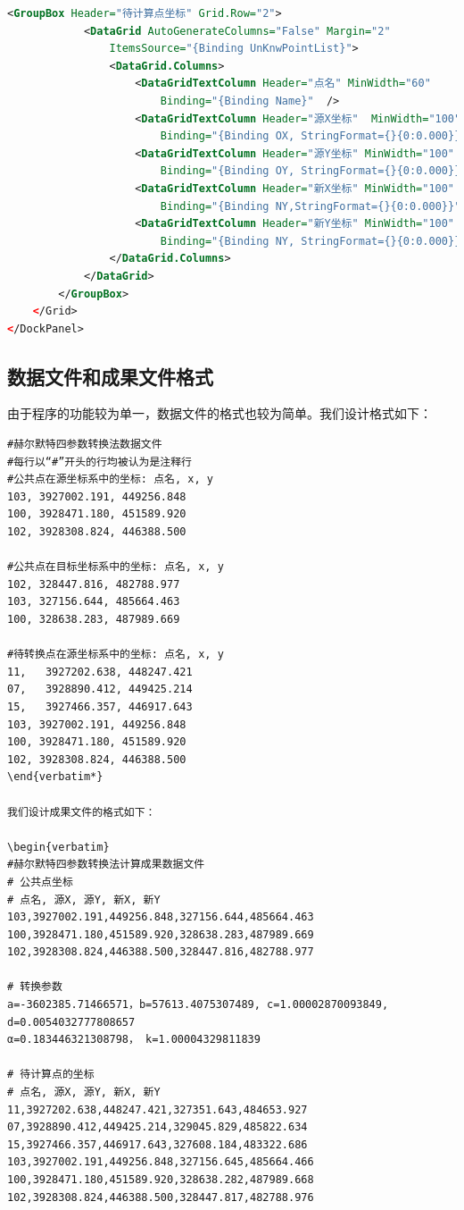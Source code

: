 \begin{lstlisting}[language=xml]
        <GroupBox Header="待计算点坐标" Grid.Row="2">
            <DataGrid AutoGenerateColumns="False" Margin="2" 
                ItemsSource="{Binding UnKnwPointList}">
                <DataGrid.Columns>
                    <DataGridTextColumn Header="点名" MinWidth="60"
                        Binding="{Binding Name}"  />
                    <DataGridTextColumn Header="源X坐标"  MinWidth="100"
                        Binding="{Binding OX, StringFormat={}{0:0.000}}"/>
                    <DataGridTextColumn Header="源Y坐标" MinWidth="100"
                        Binding="{Binding OY, StringFormat={}{0:0.000}}"/>
                    <DataGridTextColumn Header="新X坐标" MinWidth="100"
                        Binding="{Binding NY,StringFormat={}{0:0.000}}" />
                    <DataGridTextColumn Header="新Y坐标" MinWidth="100"
                        Binding="{Binding NY, StringFormat={}{0:0.000}}" />
                </DataGrid.Columns>
            </DataGrid>
        </GroupBox>
    </Grid>
</DockPanel>
\end{lstlisting}

\subsection{数据文件和成果文件格式}
由于程序的功能较为单一，数据文件的格式也较为简单。我们设计格式如下：
\begin{verbatim}
#赫尔默特四参数转换法数据文件
#每行以“#”开头的行均被认为是注释行
#公共点在源坐标系中的坐标: 点名, x, y
103, 3927002.191, 449256.848
100, 3928471.180, 451589.920
102, 3928308.824, 446388.500

#公共点在目标坐标系中的坐标: 点名, x, y
102, 328447.816, 482788.977
103, 327156.644, 485664.463
100, 328638.283, 487989.669

#待转换点在源坐标系中的坐标: 点名, x, y
11,   3927202.638, 448247.421
07,   3928890.412, 449425.214
15,   3927466.357, 446917.643
103, 3927002.191, 449256.848
100, 3928471.180, 451589.920
102, 3928308.824, 446388.500
\end{verbatim*}

我们设计成果文件的格式如下：

\begin{verbatim}
#赫尔默特四参数转换法计算成果数据文件
# 公共点坐标
# 点名, 源X, 源Y, 新X, 新Y
103,3927002.191,449256.848,327156.644,485664.463
100,3928471.180,451589.920,328638.283,487989.669
102,3928308.824,446388.500,328447.816,482788.977

# 转换参数
a=-3602385.71466571，b=57613.4075307489, c=1.00002870093849, d=0.0054032777808657
α=0.183446321308798， k=1.00004329811839

# 待计算点的坐标
# 点名, 源X, 源Y, 新X, 新Y
11,3927202.638,448247.421,327351.643,484653.927
07,3928890.412,449425.214,329045.829,485822.634
15,3927466.357,446917.643,327608.184,483322.686
103,3927002.191,449256.848,327156.645,485664.466
100,3928471.180,451589.920,328638.282,487989.668
102,3928308.824,446388.500,328447.817,482788.976
\end{verbatim}

